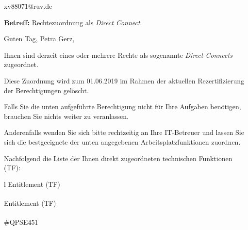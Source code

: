 \documentclass[a4paper,landscape,12pt]{letter}
\begin{document}
\begin{letter}{xv88071@ruv.de\hfill \break}
\begin{normalsize}
	\opening{\textbf{Betreff:} Rechtezuordnung als \emph{Direct Connect}}
	\begin{normalsize} \hfill
	\end{normalsize}

	\begin{normalsize}
		Guten Tag, 
	Petra Gerz, \hfill \break
	\end{normalsize}
	\end{normalsize}
	
\begin{normalsize}
	Ihnen sind derzeit eines oder mehrere Rechte als sogenannte \emph{Direct Connects} zugeordnet.
	
	Diese Zuordnung wird zum 01.06.2019 im Rahmen der aktuellen Rezertifizierung der Berechtigungen gelöscht.
	
	Falls Sie die unten aufgeführte Berechtigung nicht für Ihre Aufgaben benötigen, 
	brauchen Sie nichts weiter zu veranlassen.
	
	Anderenfalls wenden Sie sich bitte rechtzeitig an Ihre IT-Betreuer 
	und lassen Sie sich die bestgeeignete der unten angegebenen Arbeitsplatzfunktionen zuordnen.
	\end{normalsize}
	
\begin{normalsize}
	Nachfolgend die Liste der Ihnen direkt zugeordneten technischen Funktionen (TF):

	\begin{longtable}{l}
		Entitlement (TF) \\ \hline
		\endfirsthead
		\\\hline
		Entitlement (TF) \\ \hline
		\endhead %
		\multicolumn{1}{r@{}}{Fortsetzung \ldots}\\
		\endfoot
		\hline
		\endlastfoot
	\#QPSE451\\
	\end{longtable}
	\end{normalsize}
	

\end{letter}
\end{document}
